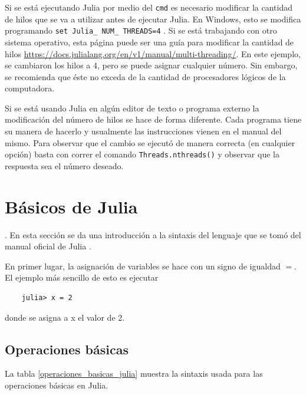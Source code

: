 Si se está ejecutando \textsf{Julia} por medio del \texttt{cmd} es necesario modificar la cantidad de hilos que se va a utilizar antes de ejecutar \textsf{Julia}.  En \textsf{Windows}, esto se modifica programando \texttt{set Julia\_ NUM\_ THREADS=4} \citep{manual_Julia}. Si se está trabajando con otro sistema operativo, esta página puede ser una guía para modificar la cantidad de hilos \url{https://docs.julialang.org/en/v1/manual/multi-threading/}. En este ejemplo, se cambiaron los hilos a 4, pero se puede asignar cualquier número. Sin embargo, se recomienda que éste no exceda de la cantidad de procesadores lógicos de la computadora.  

Si se está usando \textsf{Julia} en algún editor de texto o programa externo la modificación del número de hilos se hace de forma diferente. Cada programa tiene su manera de hacerlo y usualmente las instrucciones vienen en el manual del mismo. Para observar que el cambio se ejecutó de manera correcta (en cualquier opción) basta con correr el comando \texttt{Threads.nthreads()} y observar que la respuesta sea el número deseado. 

\section{Básicos de Julia}
 \cite{manual_Julia}. En esta sección se da una introducción a la sintaxis del lenguaje que se tomó del manual oficial de \textsf{Julia} \cite{manual_Julia}. 

En primer lugar, la asignación de variables se hace con un signo de igualdad $=$. El ejemplo más sencillo de esto es ejecutar 
\begin{verbatim}
	julia> x = 2
\end{verbatim}

\noindent donde se asigna a x el valor de 2. 

\subsection{Operaciones básicas}
La tabla \ref{operaciones_basicas_julia} muestra la sintaxis usada para las operaciones básicas en \textsf{Julia}. 

